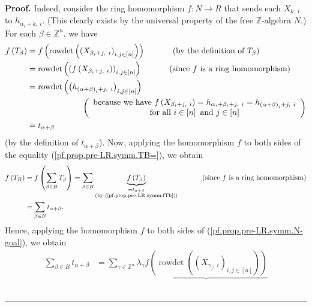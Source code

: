 \documentclass
[numbers=enddot,12pt,final,onecolumn,notitlepage,english]{scrartcl}%
\theoremstyle{definition}
\newenvironment{proof}[1][Proof]{\noindent\textbf{#1.} }{\ \rule{0.5em}{0.5em}}
\let\sumnonlimits\sum
\renewcommand{\sum}{\sumnonlimits\limits}
\begin{document}
\begin{proof}
Indeed, consider the ring homomorphism $f:N\rightarrow R$ that sends each
$X_{k,\ i}$ to $h_{\alpha_{i}+k,\ i}$. (This clearly exists by the universal
property of the free $\mathbb{Z}$-algebra $N$.) For each $\beta\in
\mathbb{Z}^{n}$, we have%
\begin{align}
f\left(  T_{\beta}\right)   &  =f\left(  \operatorname*{rowdet}\left(  \left(
X_{\beta_{i}+j,\ i}\right)  _{i,j\in\left[  n\right]  }\right)  \right)
\ \ \ \ \ \ \ \ \ \ \left(  \text{by the definition of }T_{\beta}\right)
\nonumber\\
&  =\operatorname*{rowdet}\left(  \left(  f\left(  X_{\beta_{i}+j,\ i}\right)
\right)  _{i,j\in\left[  n\right]  }\right)  \ \ \ \ \ \ \ \ \ \ \left(
\text{since }f\text{ is a ring homomorphism}\right) \nonumber\\
&  =\operatorname*{rowdet}\left(  \left(  h_{\left(  \alpha+\beta\right)
_{i}+j,\ i}\right)  _{i,j\in\left[  n\right]  }\right) \nonumber\\
&  \ \ \ \ \ \ \ \ \ \ \ \ \ \ \ \ \ \ \ \ \left(
\begin{array}
[c]{c}%
\text{because we have }f\left(  X_{\beta_{i}+j,\ i}\right)  =h_{\alpha
_{i}+\beta_{i}+j,\ i}=h_{\left(  \alpha+\beta\right)  _{i}+j,\ i}\\
\text{for all }i\in\left[  n\right]  \text{ and }j\in\left[  n\right]
\end{array}
\right) \nonumber\\
&  =t_{\alpha+\beta} \label{pf.prop.pre-LR.symm.fTb}%
\end{align}
(by the definition of $t_{\alpha+\beta}$). Now, applying the homomorphism $f$
to both sides of the equality (\ref{pf.prop.pre-LR.symm.TB=}), we obtain%
\begin{align*}
f\left(  T_{B}\right)   &  =f\left(  \sum_{\beta\in B}T_{\beta}\right)
=\sum_{\beta\in B}\underbrace{f\left(  T_{\beta}\right)  }%
_{\substack{=t_{\alpha+\beta}\\\text{(by (\ref{pf.prop.pre-LR.symm.fTb}))}%
}}\ \ \ \ \ \ \ \ \ \ \left(  \text{since }f\text{ is a ring homomorphism}%
\right) \\
&  =\sum_{\beta\in B}t_{\alpha+\beta}.
\end{align*}
Hence, applying the homomorphism $f$ to both sides of
(\ref{pf.prop.pre-LR.symm.N-goal}), we obtain%
\begin{align*}
\sum_{\beta\in B}t_{\alpha+\beta}  &  =\sum_{\gamma\in\mathbb{Z}^{n}}%
\lambda_{\gamma}\underbrace{f\left(  \operatorname*{rowdet}\left(  \left(
X_{\gamma_{j},\ i}\right)  _{i,j\in\left[  n\right]  }\right)  \right)
}
\end{align*}
\end{proof}
\end{document}
